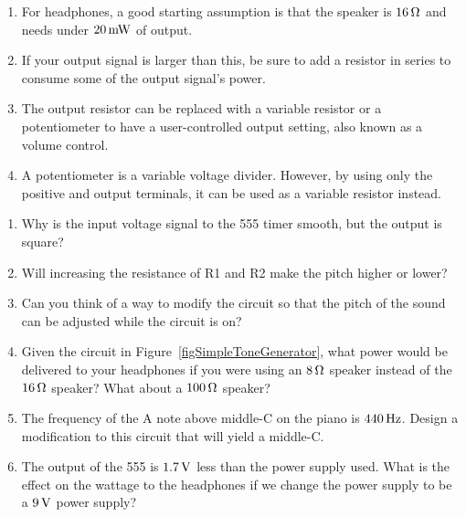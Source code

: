 \begin{enumerate}
\item For headphones, a good starting assumption is that the speaker is $16\,\si{\ohm}$ and needs under $20\,\si{\milli\watt}$ of output.
\item If your output signal is larger than this, be sure to add a resistor in series to consume some of the output signal's power.
\item The output resistor can be replaced with a variable resistor or a potentiometer to have a user-controlled output setting, also known as a volume control.
\item A potentiometer is a variable voltage divider.  However, by using only the positive and output terminals, it can be used as a variable resistor instead.
\end{enumerate}

\applysection

\begin{enumerate}
\item Why is the input voltage signal to the 555 timer smooth, but the output is square?
\item Will increasing the resistance of R1 and R2 make the pitch higher or lower?
\item Can you think of a way to modify the circuit so that the pitch of the sound can be adjusted while the circuit is on? 
\item Given the circuit in Figure~\ref{figSimpleToneGenerator}, what power would be delivered to your headphones if you were using an $8\,\si{\ohm}$ speaker instead of the $16\,\si{\ohm}$ speaker?  What about a $100\,\si{\ohm}$ speaker?
\item The frequency of the A note above middle-C on the piano is $440\,\si{\hertz}$.  Design a modification to this circuit that will yield a middle-C.
\item The output of the 555 is $1.7\,\si{\volt}$ less than the power supply used.  What is the effect on the wattage to the headphones if we change the power supply to be a $9\,\si{\volt}$ power supply?
\end{enumerate}
